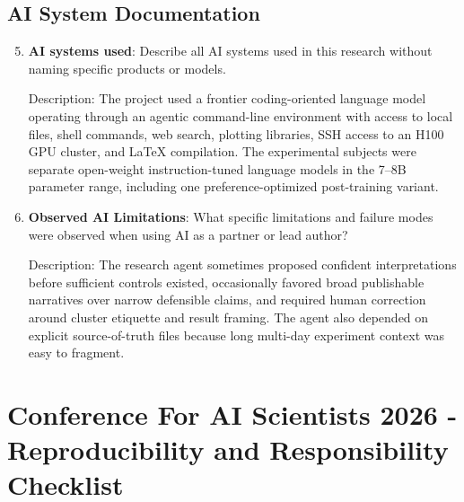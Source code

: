 \documentclass{article}
\begin{document}
\subsection*{AI System Documentation}

\begin{enumerate}
    \setcounter{enumi}{4}
    \item \textbf{AI systems used}: Describe all AI systems used in this research without naming specific products or models.

    Description: The project used a frontier coding-oriented language model operating through an agentic command-line environment with access to local files, shell commands, web search, plotting libraries, SSH access to an H100 GPU cluster, and LaTeX compilation. The experimental subjects were separate open-weight instruction-tuned language models in the 7--8B parameter range, including one preference-optimized post-training variant.

    \item \textbf{Observed AI Limitations}: What specific limitations and failure modes were observed when using AI as a partner or lead author?

    Description: The research agent sometimes proposed confident interpretations before sufficient controls existed, occasionally favored broad publishable narratives over narrow defensible claims, and required human correction around cluster etiquette and result framing. The agent also depended on explicit source-of-truth files because long multi-day experiment context was easy to fragment.
\end{enumerate}

\newpage
\section*{Conference For AI Scientists 2026 - Reproducibility and Responsibility Checklist}
\label{checklist_reproducibility}
\end{document}

